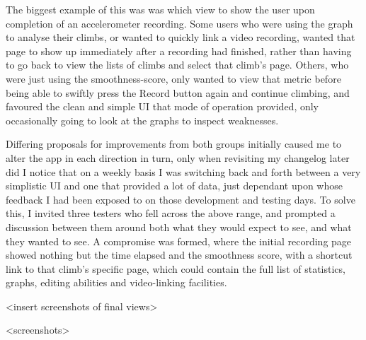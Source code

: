 The biggest example of this was was which view to show the user upon completion of an accelerometer recording.
Some users who were using the graph to analyse their climbs, or wanted to quickly link a video recording, wanted that page to show up immediately after a recording had finished, rather than having to go back to view the lists of climbs and select that climb's page.
Others, who were just using the smoothness-score, only wanted to view that metric before being able to swiftly press the Record button again and continue climbing, and favoured the clean and simple UI that mode of operation provided, only occasionally going to look at the graphs to inspect weaknesses.

Differing proposals for improvements from both groups initially caused me to alter the app in each direction in turn, only when revisiting my changelog later did I notice that on a weekly basis I was switching back and forth between a very simplistic UI and one that provided a lot of data, just dependant upon whose feedback I had been exposed to on those development and testing days.
To solve this, I invited three testers who fell across the above range, and prompted a discussion between them around both what they would expect to see, and what they wanted to see.
A compromise was formed, where the initial recording page showed nothing but the time elapsed and the smoothness score, with a shortcut link to that climb's specific page, which could contain the full list of statistics, graphs, editing abilities and video-linking facilities.

<insert screenshots of final views>



<screenshots>

